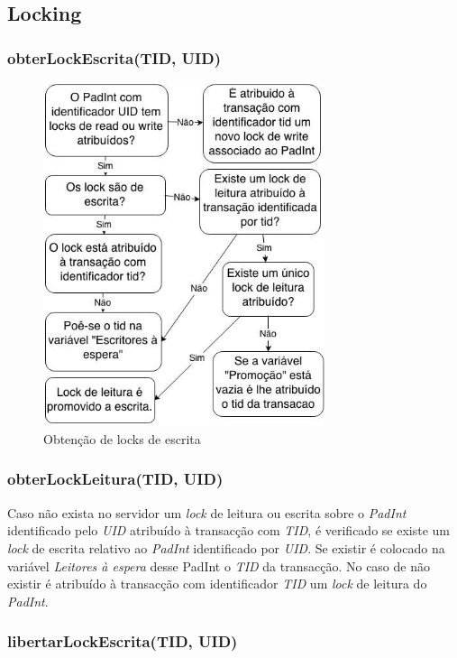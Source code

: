 \subsection{Locking}

\subsubsection{obterLockEscrita(TID, UID)}

\begin{figure}[H]
\centering
\includegraphics[width=8.25cm]{obtem_lock_w.jpg}
\caption{Obtenção de locks de escrita}
\end{figure}

\subsubsection{obterLockLeitura(TID, UID)}

Caso não exista no servidor um \textit{lock} de leitura ou escrita sobre o \textit{PadInt} identificado pelo \textit{UID} atribuído à transacção com \textit{TID}, é verificado se existe um \textit{lock} de escrita relativo ao \textit{PadInt} identificado por \textit{UID}. Se existir é colocado na variável \textit{Leitores à espera} desse PadInt o \textit{TID} da transacção. No caso de não existir é atribuído à transacção com identificador \textit{TID} um \textit{lock} de leitura do \textit{PadInt}.

\subsubsection{libertarLockEscrita(TID, UID)}


